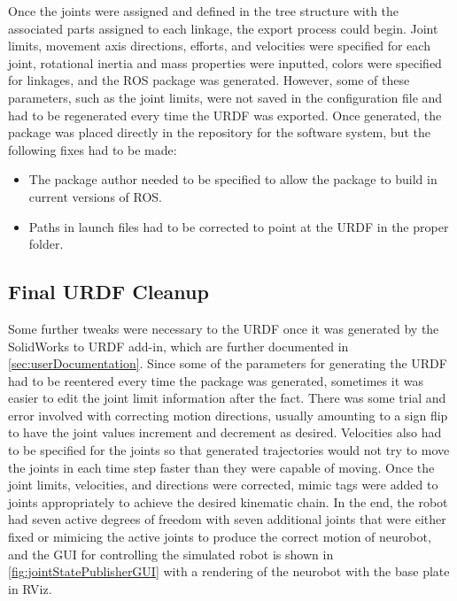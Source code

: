 \documentclass[12pt]{report}
\begin{document}
Once the joints were assigned and defined in the tree structure with the associated parts assigned to each linkage, the export process could begin. Joint limits, movement axis directions, efforts, and velocities were specified for each joint, rotational inertia and mass properties were inputted, colors were specified for linkages, and the ROS package was generated. However, some of these parameters, such as the joint limits, were not saved in the configuration file and had to be regenerated every time the URDF was exported. Once generated, the package was placed directly in the repository for the software system, but the following fixes had to be made:
\begin{itemize}
\item The package author needed to be specified to allow the package to build in current versions of ROS.
\item Paths in launch files had to be corrected to point at the URDF in the proper folder.
\end{itemize}

\subsection{Final URDF Cleanup}
Some further tweaks were necessary to the URDF once it was generated by the SolidWorks to URDF add-in, which are further documented in \autoref{sec:userDocumentation}. Since some of the parameters for generating the URDF had to be reentered every time the package was generated, sometimes it was easier to edit the joint limit information after the fact. There was some trial and error involved with correcting motion directions, usually amounting to a sign flip to have the joint values increment and decrement as desired. Velocities also had to be specified for the joints so that generated trajectories would not try to move the joints in each time step faster than they were capable of moving. Once the joint limits, velocities, and directions were corrected, mimic tags were added to joints appropriately to achieve the desired kinematic chain. In the end, the robot had seven active degrees of freedom with seven additional joints that were either fixed or mimicing the active joints to produce the correct motion of neurobot, and the GUI for controlling the simulated robot is shown in \autoref{fig:jointStatePublisherGUI} with a rendering of the neurobot with the base plate in RViz.
\end{document}
